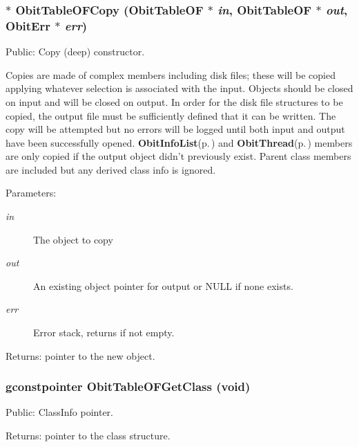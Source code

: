 \subsubsection{$\ast$ Obit\-Table\-OFCopy ({\bf Obit\-Table\-OF} $\ast$ {\em in}, {\bf Obit\-Table\-OF} $\ast$ {\em out}, {\bf Obit\-Err} $\ast$ {\em err})}\label{ObitTableOF_8c_a20}


Public: Copy (deep) constructor. 

Copies are made of complex members including disk files; these will be copied applying whatever selection is associated with the input. Objects should be closed on input and will be closed on output. In order for the disk file structures to be copied, the output file must be sufficiently defined that it can be written. The copy will be attempted but no errors will be logged until both input and output have been successfully opened. {\bf Obit\-Info\-List}{\rm (p.\,\pageref{structObitInfoList})} and {\bf Obit\-Thread}{\rm (p.\,\pageref{structObitThread})} members are only copied if the output object didn't previously exist. Parent class members are included but any derived class info is ignored. \begin{Desc}
\item[Parameters:]
\begin{description}
\item[{\em in}]The object to copy \item[{\em out}]An existing object pointer for output or NULL if none exists. \item[{\em err}]Error stack, returns if not empty. \end{description}
\end{Desc}
\begin{Desc}
\item[Returns:]pointer to the new object. \end{Desc}
\subsubsection{\setlength{\rightskip}{0pt plus 5cm}gconstpointer Obit\-Table\-OFGet\-Class (void)}\label{ObitTableOF_8c_a17}


Public: Class\-Info pointer. 

\begin{Desc}
\item[Returns:]pointer to the class structure. \end{Desc}
